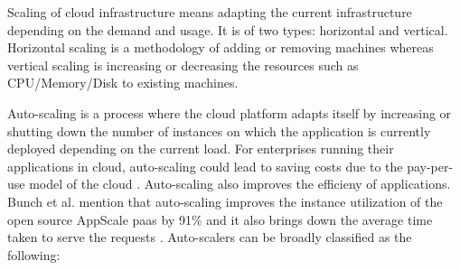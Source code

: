 \documentclass[article,type=msc,colorback,12pt,accentcolor=tud8b,table]{tudthesis}
\begin{document}
	Scaling of cloud infrastructure means adapting the current infrastructure depending on the demand and usage. It is of two types: horizontal and vertical. Horizontal scaling is a methodology of adding or removing machines whereas vertical scaling is increasing or decreasing the resources such as CPU/Memory/Disk to existing machines.
	
	Auto-scaling is a process where the cloud platform adapts itself by increasing or shutting down the number of instances on which the application is currently deployed depending on the current load. For enterprises running their applications in cloud, auto-scaling could lead to saving costs due to the pay-per-use model of the cloud \cite{armbrust2010view}. Auto-scaling also improves the efficieny of applications. Bunch et al. mention that auto-scaling improves the instance utilization of the open source AppScale \gls{paas} by 91\% and it also brings down the average time taken to serve the requests \cite{bunch2012pluggable}. Auto-scalers can be broadly classified as the following: 
	
\end{document}
